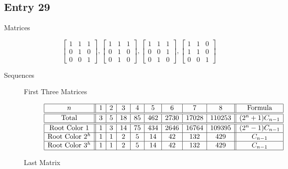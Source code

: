 \documentclass[12pt]{amsart}
\begin{document}
\subsection*{Entry 29}
\begin{description}
    \item[Matrices]
    \[\begin{bmatrix}
1 & 1 & 1 \\
0 & 1 & 0 \\
0 & 0 & 1
\end{bmatrix}, \begin{bmatrix}
1 & 1 & 1 \\
0 & 1 & 0 \\
0 & 1 & 0
\end{bmatrix}, \begin{bmatrix}
1 & 1 & 1 \\
0 & 0 & 1 \\
0 & 1 & 0
\end{bmatrix}, \begin{bmatrix}
1 & 1 & 0 \\
1 & 1 & 0 \\
0 & 0 & 1
\end{bmatrix}\]
    \item[Sequences]\hspace*{\fill}
    \begin{description}
        \item[First Three Matrices]\hspace*{\fill}\vspace{-0.5cm}
        \begin{center}
            \[
            \begin{array}{|c||c|c|c|c|c|c|c|c||c|}\hline
               n  & 1 & 2 & 3 & 4 & 5 & 6 & 7 & 8  & \text{Formula}\\\hline\hline
               \text{Total}  & 3 & 5 & 18 & 85 & 462 & 2730 & 17028 & 110253 & (2^{n}+1)C_{n-1}\\\hline\hline
               \text{Root Color }1 & 1 & 3 & 14 & 75 & 434 & 2646 & 16764 & 109395 & (2^{n}-1)C_{n-1}\\\hline
               \text{Root Color }2^{h} & 1 & 1 & 2 & 5 & 14 & 42 & 132 & 429 & C_{n-1}\\\hline
               \text{Root Color }3^{h} & 1 & 1 & 2 & 5 & 14 & 42 & 132 & 429 & C_{n-1}\\\hline
            \end{array}
            \]
        \end{center}
        \item[Last Matrix]\hspace*{\fill}\vspace{-0.5cm}

\end{description}
\end{description}
\end{document}
